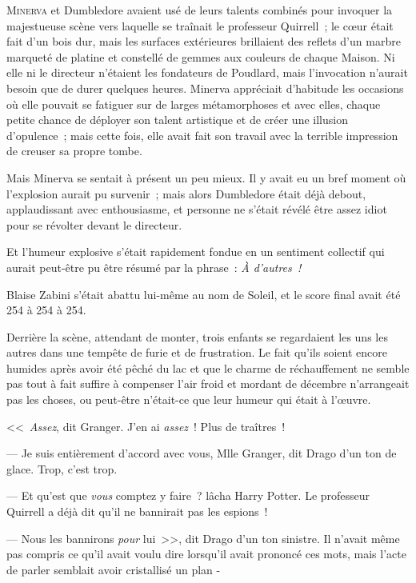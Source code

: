 
\lettrine{M}{inerva} et Dumbledore avaient usé de leurs talents combinés pour invoquer la majestueuse scène vers laquelle se traînait le professeur Quirrell~; le cœur était fait d'un bois dur, mais les surfaces extérieures brillaient des reflets d'un marbre marqueté de platine et constellé de gemmes aux couleurs de chaque Maison. Ni elle ni le directeur n'étaient les fondateurs de Poudlard, mais l'invocation n'aurait besoin que de durer quelques heures. Minerva appréciait d'habitude les occasions où elle pouvait se fatiguer sur de larges métamorphoses et avec elles, chaque petite chance de déployer son talent artistique et de créer une illusion d'opulence~; mais cette fois, elle avait fait son travail avec la terrible impression de creuser sa propre tombe.

Mais Minerva se sentait à présent un peu mieux. Il y avait eu un bref moment où l'explosion aurait pu survenir~; mais alors Dumbledore était déjà debout, applaudissant avec enthousiasme, et personne ne s'était révélé être assez idiot pour se révolter devant le directeur.

Et l'humeur explosive s'était rapidement fondue en un sentiment collectif qui aurait peut-être pu être résumé par la phrase~: \emph{À d'autres~!}

Blaise Zabini s'était abattu lui-même au nom de Soleil, et le score final avait été 254 à 254 à 254.

\later

Derrière la scène, attendant de monter, trois enfants se regardaient les uns les autres dans une tempête de furie et de frustration. Le fait qu'ils soient encore humides après avoir été pêché du lac et que le charme de réchauffement ne semble pas tout à fait suffire à compenser l'air froid et mordant de décembre n'arrangeait pas les choses, ou peut-être n'était-ce que leur humeur qui était à l'œuvre.

<<~\emph{Assez}, dit Granger. J'en ai \emph{assez}~! Plus de traîtres~!

--- Je suis entièrement d'accord avec vous, Mlle Granger, dit Drago d'un ton de glace. Trop, c'est trop.

--- Et qu'est que \emph{vous} comptez y faire~? lâcha Harry Potter. Le professeur Quirrell a déjà dit qu'il ne bannirait pas les espions~!

--- Nous les bannirons \emph{pour} lui~>>, dit Drago d'un ton sinistre. Il n'avait même pas compris ce qu'il avait voulu dire lorsqu'il avait prononcé ces mots, mais l'acte de parler semblait avoir cristallisé un plan -

